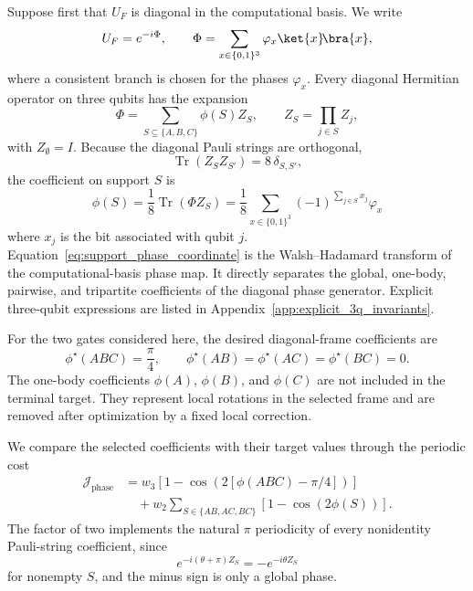 \documentclass[
  aps,
  pra,
  reprint,            %
  superscriptaddress, %
  amsmath,amssymb,
  notitlepage
]{revtex4-2}
\begin{document}
Suppose first that $U_F$ is diagonal in the computational basis. We write
\begin{equation}
U_F=e^{-i\Phi},
\qquad
\Phi=
\sum_{x\in\{0,1\}^3}
\varphi_x\ket{x}\!\bra{x},
\label{eq:diagonal_phase_generator}
\end{equation}
where a consistent branch is chosen for the phases $\varphi_x$. Every diagonal Hermitian operator on three qubits has the expansion
\begin{equation}
\Phi
=
\sum_{S\subseteq\{A,B,C\}}
\phi(S)Z_S,
\qquad
Z_S=\prod_{j\in S}Z_j,
\label{eq:diagonal_phase_expansion}
\end{equation}
with $Z_\emptyset=I$. Because the diagonal Pauli strings are orthogonal,
\begin{equation}
\operatorname{Tr}(Z_SZ_{S'})=8\,\delta_{S,S'},
\end{equation}
the coefficient on support $S$ is
\begin{equation}
\boxed{
\phi(S)
=
\frac{1}{8}\operatorname{Tr}(\Phi Z_S)
=
\frac{1}{8}
\sum_{x\in\{0,1\}^3}
(-1)^{\sum_{j\in S}x_j}\varphi_x
}
\label{eq:support_phase_coordinate}
\end{equation}
where $x_j$ is the bit associated with qubit $j$. Equation~\eqref{eq:support_phase_coordinate} is the Walsh--Hadamard transform of the computational-basis phase map. It directly separates the global, one-body, pairwise, and tripartite coefficients of the diagonal phase generator. Explicit three-qubit expressions are listed in Appendix~\ref{app:explicit_3q_invariants}.

For the two gates considered here, the desired diagonal-frame coefficients are
\begin{equation}
\phi^\star(ABC)=\frac{\pi}{4},
\qquad
\phi^\star(AB)=
\phi^\star(AC)=
\phi^\star(BC)=0.
\label{eq:target_phase_coordinates}
\end{equation}
The one-body coefficients $\phi(A)$, $\phi(B)$, and $\phi(C)$ are not included in the terminal target. They represent local rotations in the selected frame and are removed after optimization by a fixed local correction.

We compare the selected coefficients with their target values through the periodic cost
\begin{equation}
\begin{aligned}
\mathcal J_{\mathrm{phase}}
&=
w_3
\left[
1-\cos\!\left(2[\phi(ABC)-\pi/4]\right)
\right]
\\
&\quad
+w_2
\sum_{S\in\{AB,AC,BC\}}
\left[
1-\cos\!\left(2\phi(S)\right)
\right].
\end{aligned}
\label{eq:support_selective_phase_cost}
\end{equation}
The factor of two implements the natural $\pi$ periodicity of every nonidentity Pauli-string coefficient, since
\begin{equation}
e^{-i(\theta+\pi)Z_S}=-e^{-i\theta Z_S}
\end{equation}
for nonempty $S$, and the minus sign is only a global phase.
\end{document}
